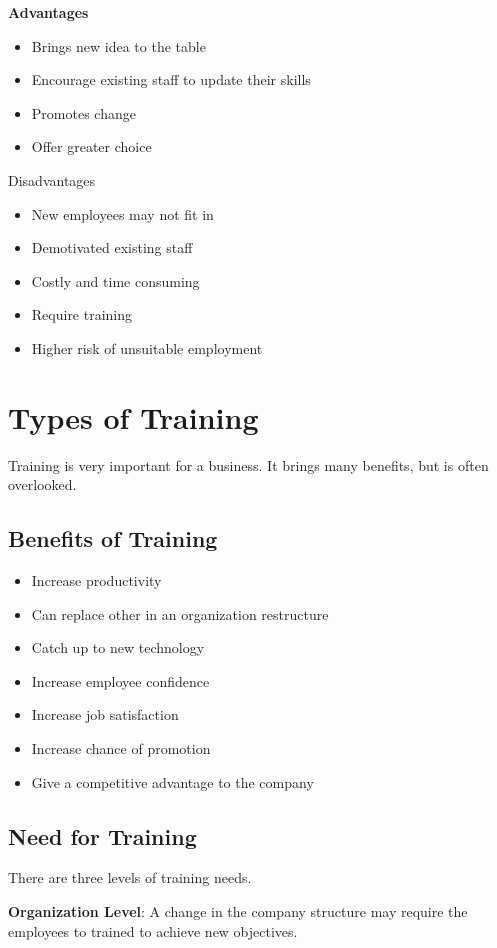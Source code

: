 \documentclass{standalone}
\begin{document}
\textbf{Advantages}\\
\begin{itemize}
	\item Brings new idea to the table
	\item Encourage existing staff to update their skills
	\item Promotes change
	\item Offer greater choice
\end{itemize}

Disadvantages\\
\begin{itemize}
	\item New employees may not fit in
	\item Demotivated existing staff
	\item Costly and time consuming
	\item Require training
	\item Higher risk of unsuitable employment
\end{itemize}

\section{Types of Training}
Training is very important for a business.
It brings many benefits, but is often overlooked.

\subsection{Benefits of Training}
\begin{itemize}
	\item Increase productivity
	\item Can replace other in an organization restructure
	\item Catch up to new technology
	\item Increase employee confidence
	\item Increase job satisfaction
	\item Increase chance of promotion
	\item Give a competitive advantage to the company
\end{itemize}

\subsection{Need for Training}
There are three levels of training needs.

\textbf{Organization Level}: A change in the company structure may require the employees to trained to achieve new objectives.
\end{document}
